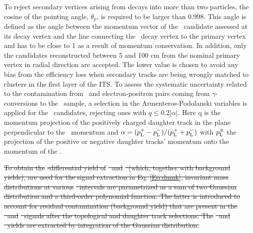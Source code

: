 \documentclass[ALICE,manyauthors]{cernphprep}
\providecommand{\DIFdeltex}[1]{{\protect\color{red}\sout{#1}}}                      %
\providecommand{\DIFdelbegin}{} %
\providecommand{\DIFdelend}{} %
\providecommand{\DIFdel}[1]{\texorpdfstring{\DIFdeltex{#1}}{}} %
\begin{document}
To reject secondary vertices arising from decays into more than two particles, the cosine of the pointing angle, $\theta_{p}$, is required to be larger than 0.998. This angle is defined as the angle between the momentum vector of the \vo~candidate assessed at its decay vertex and the line connecting the \vo~decay vertex to the primary vertex and has to be close to 1 as a result of momentum conservation. In addition, only the candidates reconstructed between 5 and 100 cm from the nominal primary vertex in radial direction are accepted. The lower value is chosen to avoid any bias from the efficiency loss when secondary tracks are being wrongly matched to clusters in the first layer of the ITS. To assess the systematic uncertainty related to the contamination from \lambdas~and electron-positron pairs coming from $\gamma$-conversions to the \Ks~sample, a selection in the Armenteros-Podolanski variables \cite{doi:10.1080/14786440108520416} is applied for the \Ks~candidates, rejecting ones with $q\le 0.2|\alpha|$. Here q is the momentum projection of the positively charged daughter track in the plane perpendicular to the \vo~momentum and $\alpha = (p_{\rm{L}}^{+} - p_{\rm{L}}^{-})/(p_{\rm{L}}^{+} + p_{\rm{L}}^{-})$ with $p_{\rm{L}}^{\pm}$ the projection of the positive or negative daughter tracks' momentum onto the momentum of the
\vo.

\DIFdelbegin \DIFdel{To obtain the }%
\DIFdel{-differential yield of }%
\DIFdel{~and }%
\DIFdel{~(which, together with background yields), are used for the signal extraction in Eq. \ref{Eq:dnmk}, invariant mass distributions at various }%
\DIFdel{~intervals are parametrized as a sum of two Gaussian distribution and a third-order polynomial function. The latter is introduced to account for residual contamination (background yield) that are present in the }%
\DIFdel{~and }%
\DIFdel{~signals after the topological and daughter track selections. The }%
\DIFdel{~and }%
\DIFdel{~yields are extracted by integration of the Gaussian distribution. %
}\DIFdelend %
\end{document}
